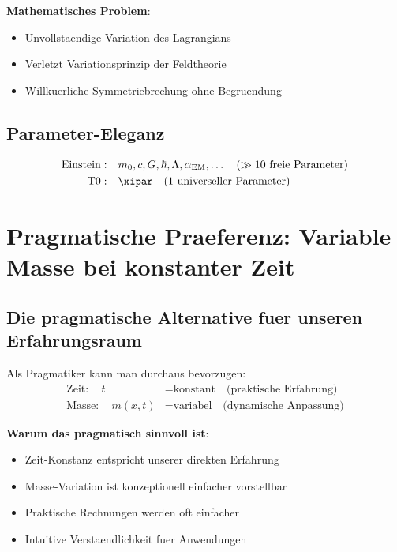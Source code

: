 	\textbf{Mathematisches Problem}:
	\begin{itemize}
		\item Unvollstaendige Variation des Lagrangians
		\item Verletzt Variationsprinzip der Feldtheorie
		\item Willkuerliche Symmetriebrechung ohne Begruendung
	\end{itemize}
	
	\subsection{Parameter-Eleganz}
	
	\begin{align}
		\text{Einstein}: \quad &m_0, c, G, \hbar, \Lambda, \alpha_{\text{EM}}, \ldots \quad (\gg 10 \text{ freie Parameter}) \\
		\text{T0}: \quad &\xipar \quad (1 \text{ universeller Parameter})
	\end{align}
	
	\section{Pragmatische Praeferenz: Variable Masse bei konstanter Zeit}
	
	\subsection{Die pragmatische Alternative fuer unseren Erfahrungsraum}
	
	Als Pragmatiker kann man durchaus bevorzugen:
	\begin{align}
		\text{Zeit}: \quad t &= \text{konstant} \quad \text{(praktische Erfahrung)} \\
		\text{Masse}: \quad m(x,t) &= \text{variabel} \quad \text{(dynamische Anpassung)}
	\end{align}
	
	\textbf{Warum das pragmatisch sinnvoll ist}:
	\begin{itemize}
		\item Zeit-Konstanz entspricht unserer direkten Erfahrung
		\item Masse-Variation ist konzeptionell einfacher vorstellbar
		\item Praktische Rechnungen werden oft einfacher
		\item Intuitive Verstaendlichkeit fuer Anwendungen
	\end{itemize}
	
